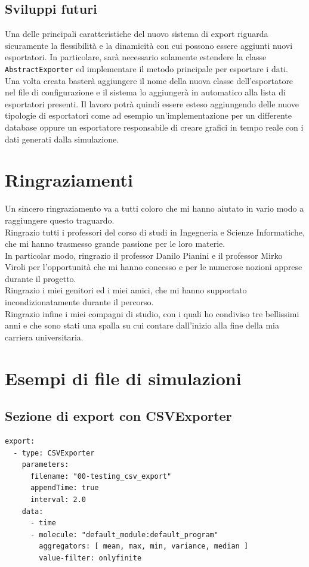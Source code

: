 \documentclass[12pt,a4paper,openright,oneside]{book}
\begin{document}
\section{Sviluppi futuri}
    Una delle principali caratteristiche del nuovo sistema di export riguarda sicuramente la flessibilità e la dinamicità con cui possono essere aggiunti nuovi esportatori.
    In particolare, sarà necessario solamente estendere la classe \texttt{AbstractExporter} ed implementare il metodo principale per esportare i dati. Una volta creata basterà aggiungere il nome della nuova classe dell'esportatore nel file di configurazione e il sistema lo aggiungerà in automatico alla lista di esportatori presenti.
    Il lavoro potrà quindi essere esteso aggiungendo delle nuove tipologie di esportatori come ad esempio un'implementazione per un differente database oppure un esportatore responsabile di creare grafici in tempo reale con i dati generati dalla simulazione.




\chapter*{Ringraziamenti}
    Un sincero ringraziamento va a tutti coloro che mi hanno aiutato in vario modo a raggiungere questo traguardo.\\
    Ringrazio tutti i professori del corso di studi in Ingegneria e Scienze Informatiche, che mi hanno trasmesso grande passione per le loro materie. \\
    In particolar modo, ringrazio il professor Danilo Pianini e il professor Mirko Viroli per l'opportunità che mi hanno concesso e per le numerose nozioni apprese durante il progetto.\\
    Ringrazio i miei genitori ed i miei amici, che mi hanno supportato incondizionatamente durante il  percorso.\\
    Ringrazio infine i miei compagni di studio, con i quali ho condiviso tre bellissimi anni e che sono stati una spalla su cui contare dall'inizio alla fine della mia carriera universitaria.

\appendix
\chapter{Esempi di file di simulazioni}

\section{Sezione di export con CSVExporter}
 \begin{verbatim}
export:
  - type: CSVExporter
    parameters: 
      filename: "00-testing_csv_export"
      appendTime: true
      interval: 2.0
    data:
      - time
      - molecule: "default_module:default_program"
        aggregators: [ mean, max, min, variance, median ]
        value-filter: onlyfinite
\end{verbatim}
\end{document}
